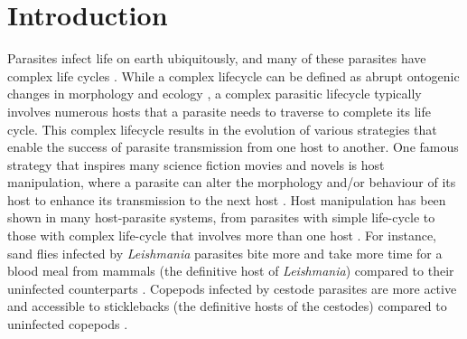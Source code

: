 \documentclass[11pt]{article}
\begin{document}
\newpage{}

\section*{Introduction}


Parasites infect life on earth ubiquitously, and many of these parasites have complex life cycles \citep{zimmer:book:2001}. 
While a complex lifecycle can be defined as abrupt ontogenic changes in morphology and ecology \citep{Benesh:2016dj}, a complex parasitic lifecycle typically involves numerous hosts that a parasite needs to traverse to complete its life cycle. 
This complex lifecycle results in the evolution of various strategies that enable the success of parasite transmission from one host to another. 
One famous strategy that inspires many science fiction movies and novels is host manipulation, where a parasite can alter the morphology and/or behaviour of its  host to enhance its transmission to the next host \citep{Hughes2012}. 
Host manipulation has been shown in many host-parasite systems, from parasites with simple life-cycle to those with complex life-cycle that involves more than one host \citep{Hughes2012, molyneux1986}. 
For instance, sand flies infected by \textit{Leishmania} parasites bite more and take more time for a blood meal from mammals (the definitive host of \textit{Leishmania}) compared to their uninfected counterparts \citep{ Rogers2007}. 
Copepods infected by cestode parasites are more active and accessible to sticklebacks (the definitive hosts of the cestodes) compared to uninfected copepods \citep{Wedekind1996}.
\end{document}
